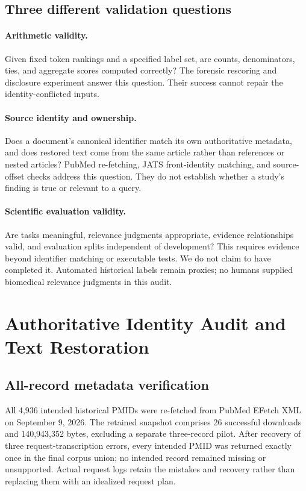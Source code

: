 \subsection{Three different validation questions}
\paragraph{Arithmetic validity.}
Given fixed token rankings and a specified label set, are counts, denominators, ties, and aggregate scores computed correctly? The forensic rescoring and disclosure experiment answer this question. Their success cannot repair the identity-conflicted inputs.

\paragraph{Source identity and ownership.}
Does a document's canonical identifier match its own authoritative metadata, and does restored text come from the same article rather than references or nested articles? PubMed re-fetching, JATS front-identity matching, and source-offset checks address this question. They do not establish whether a study's finding is true or relevant to a query.

\paragraph{Scientific evaluation validity.}
Are tasks meaningful, relevance judgments appropriate, evidence relationships valid, and evaluation splits independent of development? This requires evidence beyond identifier matching or executable tests. We do not claim to have completed it. Automated historical labels remain proxies; no humans supplied biomedical relevance judgments in this audit.

\section{Authoritative Identity Audit and Text Restoration}
\label{sec:identity}
\subsection{All-record metadata verification}
All 4,936 intended historical PMIDs were re-fetched from PubMed EFetch XML on September 9, 2026. The retained snapshot comprises 26 successful downloads and 140,943,352 bytes, excluding a separate three-record pilot. After recovery of three request-transcription errors, every intended PMID was returned exactly once in the final corpus union; no intended record remained missing or unsupported. Actual request logs retain the mistakes and recovery rather than replacing them with an idealized request plan.

